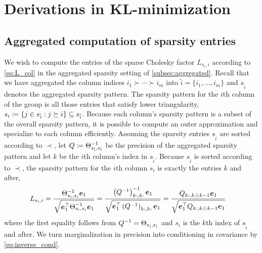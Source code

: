 \documentclass[review,supplement,onefignum,onetabnum]{siamonline220329}
\begin{document}
\maketitle

\section{Derivations in KL-minimization}

\subsection{Aggregated computation of sparsity entries}
\label{app:L_mult}

We wish to compute the entries of the sparse Cholesky factor
\( L_{s_i, i} \) according to \cref{eq:L_col} in the aggregated
sparsity setting of \cref{subsec:aggregated}.
Recall that we have aggregated the column indices \( i_1 \succ
\dotsb \succ i_m \) into \( \tilde{i} = \{ i_1, \dotsc, i_m \} \)
and \( s_{\tilde{i}} \) denotes the aggregated sparsity pattern.
The sparsity pattern for the \( i \)th column of the group is all
those entries that satisfy lower triangularity, \( s_i \coloneqq \{
j \in s_{\tilde{i}} : j \succeq i \} \subseteq s_{\tilde{i}} \).
Because each column's sparsity pattern is a subset of the
overall sparsity pattern, it is possible to compute an outer
approximation and specialize to each column efficiently.
Assuming the sparsity entries \( s_{\tilde{i}} \) are sorted according to
\( \prec \), let \( Q \coloneqq \Theta_{s_{\tilde{i}}, s_{\tilde{i}}}^{-1} \) be
the precision of the aggregated sparsity pattern and let \( k \) be the \(
i \)th column's index in \( s_{\tilde{i}} \).
Because \( s_{\tilde{i}} \) is sorted according to \(
\prec \), the sparsity pattern for the \( i \)th column
\( s_i \) is exactly the entries \( k \) and after,
\begin{align}
  \label{eq:L_precision}
  L_{s_i, i}
   &= \frac{\CM_{s_i, s_i}^{-1} \vec{e}_1}
           {\sqrt{\vec{e}_1^{\top} \CM_{s_i, s_i}^{-1} \vec{e}_1}}
    = \frac{\left (Q^{-1} \right )_{k:, k:}^{-1} \vec{e}_1}
           {\sqrt{\vec{e}_1^{\top} \left (Q^{-1} \right )_{k:, k:} \vec{e}_1}}
    = \frac{Q_{k:, k: \mid :k - 1} \vec{e}_1}
           {\sqrt{\vec{e}_1^{\top} Q_{k:, k: \mid :k - 1} \vec{e}_1}}
\end{align}
where the first equality follows from \( Q^{-1} =
\Theta_{s_{\tilde{i}}, s_{\tilde{i}}} \) and \( s_i \) is
the \( k \)th index of \( s_{\tilde{i}} \) and after.
We turn marginalization in precision into
conditioning in covariance by \cref{eq:inverse_cond}.
\end{document}
